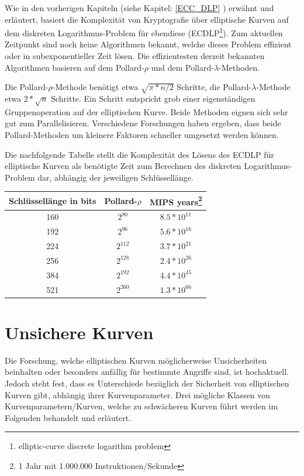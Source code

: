 Wie in den vorherigen Kapiteln (siehe Kapitel: \ref{ECC_DLP} ) erwähnt und erläutert, basiert die Komplexität
von Kryptografie über elliptische Kurven auf dem diskreten Logarithmus-Problem für ebendiese 
(ECDLP\footnote{elliptic-curve discrete logarithm problem}).
Zum aktuellen Zeitpunkt sind noch keine Algorithmen bekannt, welche dieses Problem effizient oder in subexponentieller Zeit
lösen.
Die effizientesten derzeit bekannten Algorithmen basieren auf dem Pollard-$\rho$ und dem Pollard-$\lambda$-Methoden\cite{ecc_complexity}.

Die Pollard-$\rho$-Methode benötigt etwa $\sqrt{\pi * n / 2}$ Schritte, die Pollard-$\lambda$-Methode etwa $2*\sqrt{n}$ Schritte.
Ein Schritt entspricht grob einer eigenständigen Gruppenoperation auf der elliptischen Kurve. Beide Methoden eignen sich
sehr gut zum Parallelisieren. Verschiedene Forschungen haben ergeben, dass beide Pollard-Methoden um kleinere Faktoren
schneller umgesetzt werden können\cite{ecc_complexity}.

Die nachfolgende Tabelle stellt die Komplexität des Lösens des ECDLP für elliptische Kurven als benötigte Zeit zum Berechnen
des diskreten Logarithmus-Problem dar, abhängig der jeweiligen Schlüssellänge.

\begin{center}
	\begin{tabular}{ |c|c|c| }
		\hline
		Schlüssellänge in bits & Pollard-$\rho$ & MIPS years\footnote{1 Jahr mit 1.000.000 Instruktionen/Sekunde} \\
		\hline
		\hline
		160 & $2^{80}$ & $8.5 * 10^{11}$ \\
		\hline
		192 & $2^{96}$ & $5.6 * 10^{16}$ \\
		\hline
		224 & $2^{112}$ & $3.7 * 10^{21}$ \\
		\hline
		256 & $2^{128}$ & $2.4 * 10^{26}$ \\
		\hline
		384 & $2^{192}$ & $4.4 * 10^{45}$ \\
		\hline
		521 & $2^{260}$ & $1.3 * 10^{66}$ \\
		\hline
	\end{tabular}
\end{center}

\newpage

\section{Unsichere Kurven}

Die Forschung, welche elliptischen Kurven möglicherweise Unsicherheiten beinhalten oder besonders anfällig für bestimmte
Angriffe sind, ist hochaktuell. Jedoch steht fest, dass es Unterschiede bezüglich der Sicherheit von elliptischen Kurven
gibt, abhängig ihrer Kurvenparameter. Drei mögliche Klassen von Kurvenparametern/Kurven, welche zu schwächeren Kurven
führt werden im Folgenden behandelt und erläutert.

